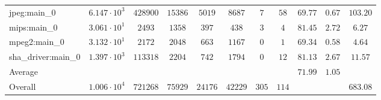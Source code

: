 \begin{tabular}{|l|c|c|c|c|c|c|c|c|c|c|}
jpeg:main\_0            & $ 6.147 \cdot 10^{3} $ & $ 428900 $ & $ 15386 $ & $ 5019  $ & $ 8687  $ & $ 7   $ & $ 58  $ & $ 69.77       $ & $ 0.67    $ & $ 103.20  $ \\
mips:main\_0            & $ 3.061 \cdot 10^{1} $ & $ 2493   $ & $ 1358  $ & $ 397   $ & $ 438   $ & $ 3   $ & $ 4   $ & $ 81.45       $ & $ 2.72    $ & $ 6.27    $ \\
mpeg2:main\_0           & $ 3.132 \cdot 10^{1} $ & $ 2172   $ & $ 2048  $ & $ 663   $ & $ 1167  $ & $ 0   $ & $ 1   $ & $ 69.34       $ & $ 0.58    $ & $ 4.64    $ \\
sha\_driver:main\_0     & $ 1.397 \cdot 10^{3} $ & $ 113318 $ & $ 2204  $ & $ 742   $ & $ 1794  $ & $ 0   $ & $ 12  $ & $ 81.13       $ & $ 2.67    $ & $ 11.57   $ \\
\hline
Average                 & $                    $ & $        $ & $       $ & $       $ & $       $ & $     $ & $     $ & $ 71.99       $ & $ 1.05    $ & $         $ \\
\hline
Overall                 & $ 1.006 \cdot 10^{4} $ & $ 721268 $ & $ 75929 $ & $ 24176 $ & $ 42229 $ & $ 305 $ & $ 114 $ & $             $ & $         $ & $ 683.08  $ \\
\hline
\end{tabular}

